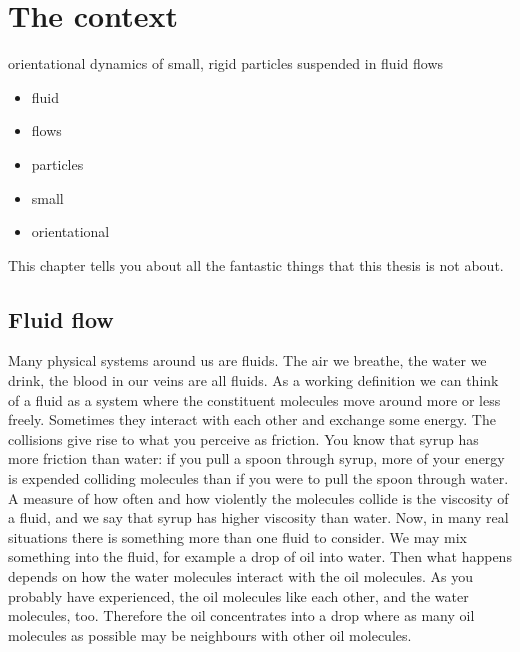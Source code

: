\documentclass[thesis.tex]{subfiles}
\begin{document}
\chapter{The context}

orientational dynamics of small, rigid particles suspended in fluid flows

\begin{itemize}
	\item fluid
	\item flows
	\item particles
	\item small
	\item orientational
\end{itemize}

This chapter tells you about all the fantastic things that this thesis is not about.

\section{Fluid flow}

Many physical systems around us are fluids. The air we breathe, the water we drink, the blood in our veins are all fluids. As a working definition we can think of a fluid as a system where the constituent molecules move around more or less freely. Sometimes they interact with each other and exchange some energy. The collisions give rise to what you perceive as friction. You know that syrup has more friction than water: if you pull a spoon through syrup, more of your energy is expended colliding molecules than if you were to pull the spoon through water. A measure of how often and how violently the molecules collide is the viscosity of a fluid, and we say that syrup has higher viscosity than water. Now, in many real situations there is something more than one fluid to consider. We may mix something into the fluid, for example a drop of oil into water. Then what happens depends on how the water molecules interact with the oil molecules. As you probably have experienced, the oil molecules like each other, and the water molecules, too. Therefore the oil concentrates into a drop where as many oil molecules as possible may be neighbours with other oil molecules.
\end{document}
